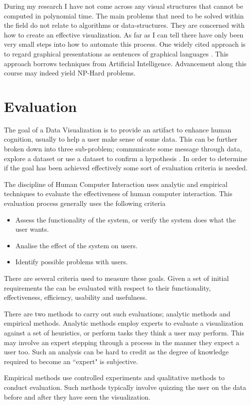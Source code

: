 \documentclass[a4paper, 10pt, titlepage, twocolumn, onehalfspace]{article}
\begin{document}
During my research I have not come across any visual structures that cannot be computed in polynomial time. The main problems that need to be solved within the field do not relate to algorithms or data-structures. They are concerned with how to create an effective visualization. As far as I can tell there have only been very small steps into how to automate this process. One widely cited approach is to regard graphical presentations as sentences of graphical languages \cite{mackinlay1986automating}. This approach borrows techniques from Artificial Intelligence. Advancement along this course may indeed yield NP-Hard problems.

\section{Evaluation}
The goal of a Data Visualization is to provide an artifact to enhance human cognition, usually to help a user make sense of some data. This can be further broken down into three sub-problem; communicate some message through data, explore a dataset or use a dataset to confirm a hypothesis \cite{mazza2009introduction} . In order to determine if the goal has been achieved effectively some sort of evaluation criteria is needed. 

The discipline of Human Computer Interaction uses analytic and empirical techniques to evaluate the effectiveness of human computer interaction. This evaluation process generally uses the following criteria \cite{dix2004human}
\begin{itemize}
\item Assess the functionality of the system, or verify the system does what the user wants.
\item Analise the effect of the system on users.
\item Identify possible problems with users.
\end{itemize}
There are several criteria used to measure these goals. Given a set of initial requirements the can be evaluated with respect to their functionality, effectiveness, efficiency, usability and usefulness.

There are two methods to carry out such evaluations; analytic methods and empirical methods. Analytic methods employ experts to evaluate a visualization against a set of heuristics, or perform tasks they think a user may perform. This may involve an expert stepping through a process in the manner they expect a user too. Such an analysis can be hard to credit as the degree of knowledge required to become an ``expert" is subjective.

Empirical methods use controlled experiments and qualitative methods to conduct evaluation. Such methods typically involve quizzing the user on the data before and after they have seen the visualization.


\newpage


 


 
\end{document}
